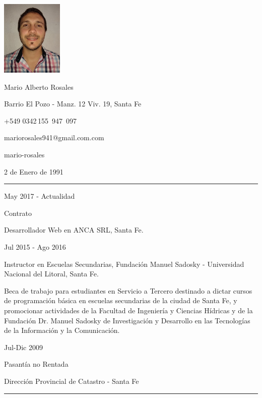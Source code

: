 \documentclass[a4paper,10pt]{article}
\newlength{\cvcolumngapwidth}
\newlength{\cvleftcolumnwidth}
\newlength{\cvrightcolumnwidth}
\newcommand{\cvnamestyle}[1]{{\Large\cvnamefont\textcolor{cvnamecolor}{#1}}}
\newcommand{\cvsectionstyle}[1]{{\normalsize\cvsectionfont\textcolor{cvsectioncolor}{#1}}}
\newcommand{\cvtitlestyle}[1]{{\large\cvtitlefont\textcolor{cvtitlecolor}{#1}}}
\newcommand{\cvdurationstyle}[1]{{\small\cvdurationfont\textcolor{cvdurationcolor}{#1}}}
\newlength{\cvafteritemskipamount}
\newlength{\cvaftersectionskipamount}
\newlength{\cvafternameskipamount}
\newlength{\cvafterpersonalinfolineskipamount}
\newlength{\cvaftertitleskipamount}
\newlength{\cvparskip}
\newcommand{\cvpersonalinfo}[2]{
    \begin{minipage}[t]{\cvleftcolumnwidth}
        \vspace{0mm} %
        \raggedleft #1
    \end{minipage}%
    \hspace{\cvcolumngapwidth}%
    \begin{minipage}[t]{\cvrightcolumnwidth}
        \vspace{0mm} %
        #2
    \end{minipage}

    \vspace{\cvafteritemskipamount}
}
\newcommand{\cvname}[1]{
    \cvnamestyle{#1}

    \vspace{\cvafternameskipamount}
}
\newcommand{\cvpersonalinfolinewithicon}[3]{
    \raisebox{.5\fontcharht\font`E-.5\height}{\texttt{[image: \#2]}}
    #3

    \vspace{\cvafterpersonalinfolineskipamount}
}
\newcommand{\cvsection}[1]{
    \begin{minipage}[t]{\cvleftcolumnwidth}
        \raggedleft\cvsectionstyle{#1}
    \end{minipage}%
    \hspace{\cvcolumngapwidth}%
    \begin{minipage}[t]{\cvrightcolumnwidth}
        \textcolor{cvrulecolor}{\rule{\cvrightcolumnwidth}{0.3mm}}
    \end{minipage}

    \vspace{\cvaftersectionskipamount}
}
\newcommand{\cvitem}[2]{
    \begin{minipage}[t]{\cvleftcolumnwidth}
        \raggedleft #1
    \end{minipage}%
    \hspace{\cvcolumngapwidth}%
    \begin{minipage}[t]{\cvrightcolumnwidth}
        \setlength{\parskip}{\cvparskip} #2
    \end{minipage}

    \vspace{\cvafteritemskipamount}
}
\newcommand{\cvtitle}[1]{
    \cvtitlestyle{#1}

    \vspace{\cvaftertitleskipamount}
    \vspace{-\cvparskip}
}
\begin{document}

\cvpersonalinfo{
    \includegraphics[height=36mm]{photo.jpg}
}{
    \cvname{Mario Alberto Rosales}

    \cvpersonalinfolinewithicon{height=4mm}{072-location.pdf}{
        Barrio El Pozo - Manz. 12 Viv. 19, Santa Fe
    }

    \cvpersonalinfolinewithicon{height=4mm}{067-phone.pdf}{
        +549 0342\,155\, 947 \,097
    }

    \cvpersonalinfolinewithicon{height=4mm}{070-envelop.pdf}{
        mariorosales941@gmail.com.com
    }

    \cvpersonalinfolinewithicon{height=4mm}{458-linkedin.pdf}{
        mario-rosales
    }

    2 de Enero de 1991
}



\cvsection{EXPERIENCIA LABORAL}

\cvitem{
    \cvdurationstyle{May 2017 - Actualidad}
}{
    \cvtitle{Contrato}
    Desarrollador Web en ANCA SRL, Santa Fe.
}

\cvitem{
    \cvdurationstyle{Jul 2015 - Ago 2016}
}{
    \cvtitle{Instructor en Escuelas Secundarias, Fundación Manuel Sadosky - Universidad Nacional del Litoral, Santa Fe.}
    Beca de trabajo para estudiantes en Servicio a Tercero destinado a dictar cursos de programación básica en escuelas secundarias de la ciudad de Santa Fe, y promocionar actividades de la Facultad de Ingeniería y Ciencias Hídricas y de la Fundación Dr. Manuel Sadosky de Investigación y Desarrollo en las Tecnologías de la Información y la Comunicación.
}

\cvitem{
    \cvdurationstyle{Jul-Dic 2009}
}{
    \cvtitle{Pasantía no Rentada}
    Dirección Provincial de Catastro - Santa Fe
}


\cvsection{FORMACIÓN ACADÉMICA}
\end{document}
